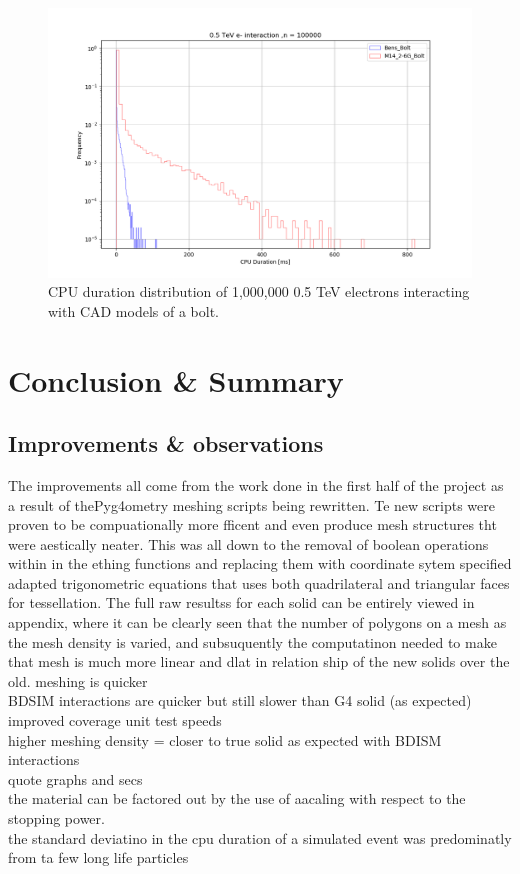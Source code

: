 \documentclass[12pt,a4paper]{article}
\begin{document}
\begin{figure}[h!]
\centering
\includegraphics[scale=0.5]{Images//CAD_Screw//cpudist1.png}
\caption[width=\columnwidth]{CPU duration distribution of 1,000,000 0.5 TeV electrons interacting with CAD models of a bolt.}
\label{brgqebafd}
\end{figure}

\newpage
\section{Conclusion \& Summary}
\label{conc}

\subsection{Improvements \& observations}

The improvements all come from the work done in the first half of the project as a result of thePyg4ometry meshing scripts being rewritten. Te new scripts were proven to be compuationally more fficent and even produce mesh structures tht were aestically neater. This was all down to the removal of boolean operations within in the ething functions and replacing them with coordinate sytem specified adapted trigonometric equations that uses both quadrilateral and triangular faces for tessellation. The full raw resultss for each solid can be entirely viewed in appendix, where it can be clearly seen that the number of polygons on a mesh as the mesh density is varied, and subsuquently the computatinon needed to make that mesh is much more linear and dlat in relation ship of the new solids over the old.  
meshing is quicker\\
BDSIM interactions are quicker but still slower than G4 solid (as expected)
improved coverage unit test speeds\\
higher meshing density = closer to true solid as expected with BDISM interactions\\
quote graphs and secs\\
the material can be factored out by the use of aacaling with respect to the stopping power.\\
the standard deviatino in the cpu duration of a simulated event was predominatly from ta few long life particles\\
\end{document}
